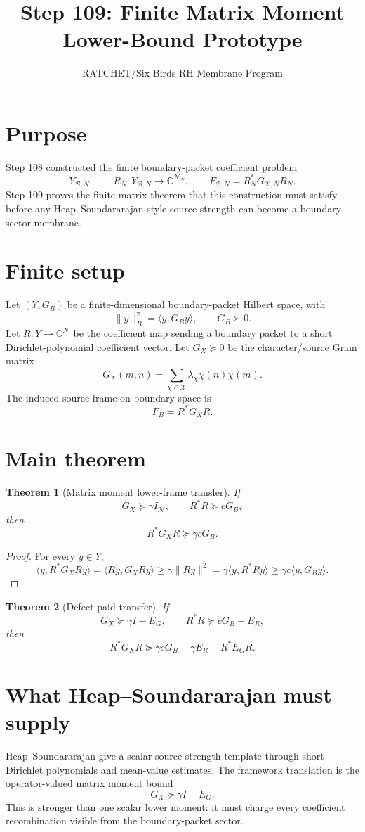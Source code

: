 \documentclass[11pt]{article}
\title{Step 109: Finite Matrix Moment Lower-Bound Prototype}
\author{RATCHET/Six Birds RH Membrane Program}
\date{}
\newtheorem{theorem}{Theorem}
\begin{document}
\maketitle

\section{Purpose}
Step 108 constructed the finite boundary-packet coefficient problem
\[
Y_{\mathcal B,N},\qquad R_N:Y_{\mathcal B,N}\to \mathbb C^{\mathcal N_N},
\qquad F_{\mathcal B,N}=R_N^*G_{\mathcal X,N}R_N.
\]
Step 109 proves the finite matrix theorem that this construction must satisfy before any Heap--Soundararajan-style source strength can become a boundary-sector membrane.

\section{Finite setup}
Let $(Y,G_B)$ be a finite-dimensional boundary-packet Hilbert space, with
\[
\|y\|_B^2=\langle y,G_By\rangle,\qquad G_B\succ0.
\]
Let $R:Y\to \mathbb C^{\mathcal N}$ be the coefficient map sending a boundary packet to a short Dirichlet-polynomial coefficient vector. Let $G_X\succeq0$ be the character/source Gram matrix
\[
G_X(m,n)=\sum_{\chi\in\mathcal X}\lambda_\chi\chi(n)\overline{\chi(m)}.
\]
The induced source frame on boundary space is
\[
F_B=R^*G_XR.
\]

\section{Main theorem}
\begin{theorem}[Matrix moment lower-frame transfer]
If
\[
G_X\succeq \gamma I_{\mathcal N},\qquad R^*R\succeq cG_B,
\]
then
\[
\boxed{R^*G_XR\succeq \gamma cG_B.}
\]
\end{theorem}
\begin{proof}
For every $y\in Y$,
\[
\langle y,R^*G_XRy\rangle=\langle Ry,G_XRy\rangle\ge \gamma\|Ry\|^2=\gamma\langle y,R^*Ry\rangle\ge \gamma c\langle y,G_By\rangle.
\]
\end{proof}

\begin{theorem}[Defect-paid transfer]
If
\[
G_X\succeq \gamma I-E_G,\qquad R^*R\succeq cG_B-E_R,
\]
then
\[
\boxed{R^*G_XR\succeq\gamma cG_B-\gamma E_R-R^*E_GR.}
\]
\end{theorem}

\section{What Heap--Soundararajan must supply}
Heap--Soundararajan give a scalar source-strength template through short Dirichlet polynomials and mean-value estimates. The framework translation is the operator-valued matrix moment bound
\[
G_X\succeq \gamma I-E_G.
\]
This is stronger than one scalar lower moment: it must charge every coefficient recombination visible from the boundary-packet sector.
\end{document}
